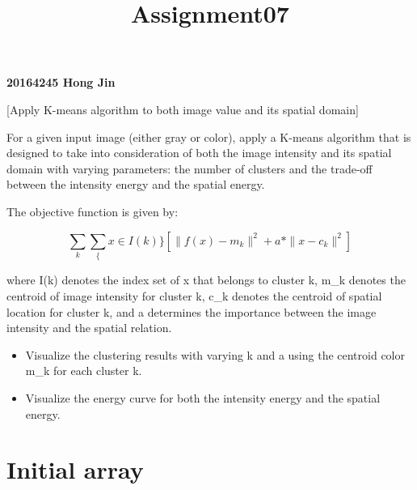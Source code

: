 \documentclass[11pt]{article}
\title{Assignment07}
\begin{document}
    
    
    \maketitle
    
    

    
    \textbf{20164245 Hong Jin}

    {[}Apply K-means algorithm to both image value and its spatial domain{]}

For a given input image (either gray or color), apply a K-means
algorithm that is designed to take into consideration of both the image
intensity and its spatial domain with varying parameters: the number of
clusters and the trade-off between the intensity energy and the spatial
energy.

The objective function is given by:

\[\sum_k \sum_\{ x \in I(k) \} [ \| f(x) - m_k \|^2 + a * \| x - c_k \|^2 ]\]

where I(k) denotes the index set of x that belongs to cluster k, m\_k
denotes the centroid of image intensity for cluster k, c\_k denotes the
centroid of spatial location for cluster k, and a determines the
importance between the image intensity and the spatial relation.

\begin{itemize}
\item
  Visualize the clustering results with varying k and a using the
  centroid color m\_k for each cluster k.
\item
  Visualize the energy curve for both the intensity energy and the
  spatial energy.
\end{itemize}

    \section{Initial array}\label{initial-array}
\end{document}
